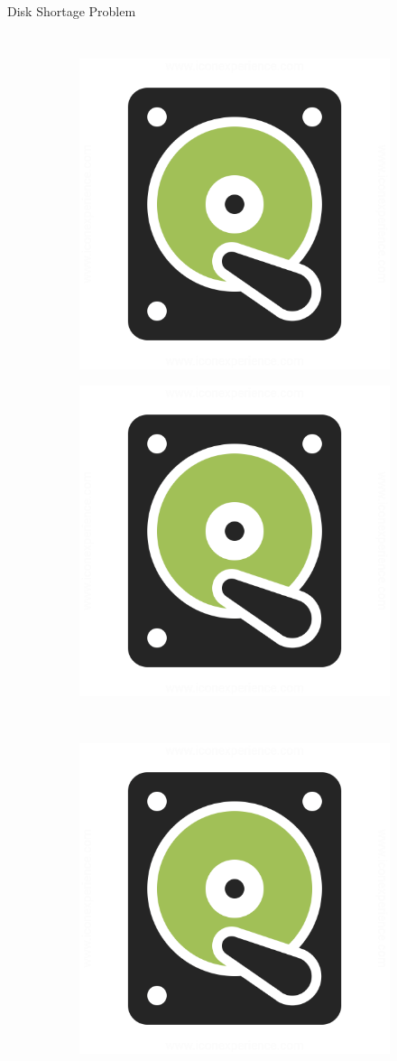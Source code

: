 \begin{frame}{Disk Shortage Problem}
\begin{columns}
\begin{figure}
         \begin{subfigure}{\textwidth}
            \includegraphics[width = .3\textwidth, keepaspectration]{attachments/vodro/hard_drive.png}
         \end{subfigure}
         \begin{subfigure}{\textwidth}
            \includegraphics[width = .3\textwidth, keepaspectration]{attachments/vodro/hard_drive.png}
         \end{subfigure}
         \\\pause
         \begin{subfigure}{\textwidth}
            \includegraphics[width = .3\textwidth, keepaspectration]{attachments/vodro/hard_drive.png}
         \end{subfigure}
     \end{figure}
     \end{columns}
\end{frame}


